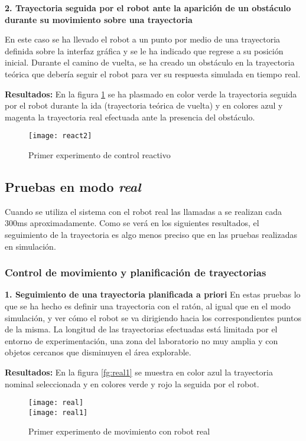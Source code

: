 \noindent
\textbf{\textbf{2.} Trayectoria seguida por el robot ante la aparición de un obstáculo durante su movimiento sobre una trayectoria}

En este caso se ha llevado el robot a un punto por medio de una trayectoria definida sobre la interfaz gráfica y se le ha indicado que regrese a su posición inicial. Durante el camino de vuelta, se ha creado un obstáculo en la trayectoria teórica que debería seguir el robot para ver su respuesta simulada en tiempo real.

\textbf{Resultados:}
En la figura \ref{fg:react3} se ha plasmado en color verde la trayectoria seguida por el robot durante la ida (trayectoria teórica de vuelta) y en colores azul y magenta la trayectoria real efectuada ante la presencia del obstáculo.
\begin{figure}[h]
  \centering\texttt{[image: react2]}\\
  \caption{Primer experimento de control reactivo}\label{fg:react3}
\end{figure}


\subsection{Pruebas en modo \emph{real}}
Cuando se utiliza el sistema con el robot real las llamadas a  se realizan cada 300ms aproximadamente. Como se verá en los siguientes resultados, el seguimiento de la trayectoria es algo menos preciso que en las pruebas realizadas en simulación.

\subsubsection{Control de movimiento y planificación de trayectorias}

\noindent
\textbf{\textbf{1.} Seguimiento de una trayectoria planificada a priori}
En estas pruebas lo que se ha hecho es definir una trayectoria con el ratón, al igual que en el modo simulación, y ver cómo el robot se va dirigiendo hacia los correspondientes puntos de la misma. La longitud de las trayectorias efectuadas está limitada por el entorno de experimentación, una zona del laboratorio no muy amplia y con objetos cercanos que disminuyen el área explorable.

\textbf{Resultados:}
En la figura \ref{fg:real1} se muestra en color azul la trayectoria nominal seleccionada y en colores verde y rojo la seguida por el robot.
\begin{figure}[h]
  \centering\texttt{[image: real]}\\
  \hspace{0.5cm}\texttt{[image: real1]}
  \caption{Primer experimento de movimiento con robot real}\label{fg:real}
\end{figure}

